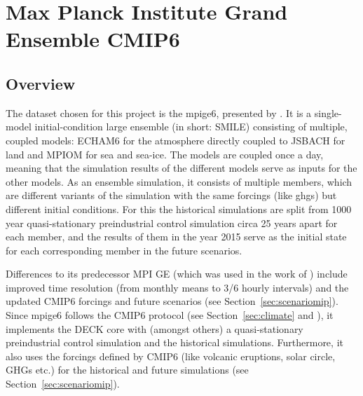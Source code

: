 \chapter{Max Planck Institute Grand Ensemble CMIP6}
\label{ch:dataset}

\section{Overview}

The dataset chosen for this project is the \ac{mpige6}, presented by \citeauthor{olonscheck_new_2023}. 
It is a single-model initial-condition large ensemble (in short: SMILE) consisting of multiple, coupled models: ECHAM6 for the atmosphere directly coupled to JSBACH for land and MPIOM for sea and sea-ice. 
The models are coupled once a day, meaning that the simulation results of the different models serve as inputs for the other models.
As an ensemble simulation, it consists of multiple members, which are different variants of the simulation with the same forcings (like \acp{ghg}) but different initial conditions. 
For this the historical simulations are split from 1000 year quasi-stationary preindustrial control simulation circa 25 years apart for each member, and the results of them in the year 2015 serve as the initial state for each corresponding member in the future scenarios. \cite{olonscheck_new_2023}

 

Differences to its predecessor MPI GE \cite{maher_max_2019} (which was used in the work of \citeauthor{vietinghoffdiss} \cite{vietinghoffdiss}) include improved time resolution (from monthly means to 3/6 hourly intervals) and the updated CMIP6 forcings and future scenarios (see Section~\ref{sec:scenariomip}). 
Since \ac{mpige6} follows the CMIP6 protocol (see Section~\ref{sec:climate} and \cite{eyring_overview_2016}), it implements the DECK core with (amongst others) a quasi-stationary preindustrial control simulation and the historical simulations.
Furthermore, it also uses the forcings defined by CMIP6 (like volcanic eruptions, solar circle, GHGs etc.) for the historical and future simulations (see Section~\ref{sec:scenariomip}).




